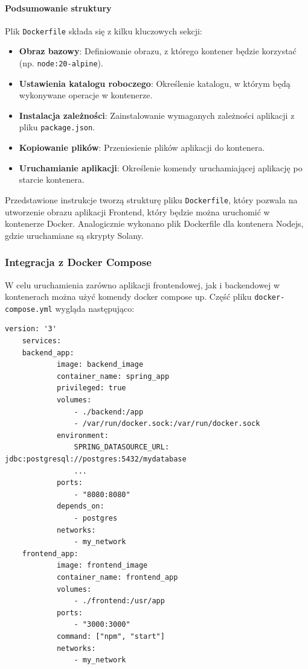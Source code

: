 \paragraph{Podsumowanie struktury}
Plik \texttt{Dockerfile} składa się z kilku kluczowych sekcji:
\begin{itemize}
    \item \textbf{Obraz bazowy}: Definiowanie obrazu, z którego kontener będzie korzystać (np. \texttt{node:20-alpine}).
    \item \textbf{Ustawienia katalogu roboczego}: Określenie katalogu, w którym będą wykonywane operacje w kontenerze.
    \item \textbf{Instalacja zależności}: Zainstalowanie wymaganych zależności aplikacji z pliku \texttt{package.json}.
    \item \textbf{Kopiowanie plików}: Przeniesienie plików aplikacji do kontenera.
    \item \textbf{Uruchamianie aplikacji}: Określenie komendy uruchamiającej aplikację po starcie kontenera.
\end{itemize}

Przedstawione instrukcje tworzą strukturę pliku \texttt{Dockerfile}, który pozwala na utworzenie obrazu aplikacji Frontend, który będzie można uruchomić w kontenerze Docker. Analogicznie wykonano plik Dockerfile dla kontenera Nodejs, gdzie uruchamiane są skrypty Solany.

\subsubsection{Integracja z Docker Compose}
W celu uruchamienia zarówno aplikacji frontendowej, jak i backendowej w kontenerach można użyć komendy docker compose up. Część pliku \texttt{docker-compose.yml} wygląda następująco:

\begin{lstlisting}[tabsize=2,basicstyle=\footnotesize\ttfamily]
version: '3'
	services:
    backend_app:
			image: backend_image
			container_name: spring_app
			privileged: true
			volumes:
				- ./backend:/app
				- /var/run/docker.sock:/var/run/docker.sock
			environment:
				SPRING_DATASOURCE_URL: jdbc:postgresql://postgres:5432/mydatabase
				...
			ports:
				- "8080:8080"
			depends_on:
				- postgres
			networks:
				- my_network
    frontend_app:
			image: frontend_image
			container_name: frontend_app
			volumes:
				- ./frontend:/usr/app
			ports:
				- "3000:3000"
			command: ["npm", "start"]
			networks:
				- my_network
\end{lstlisting}

